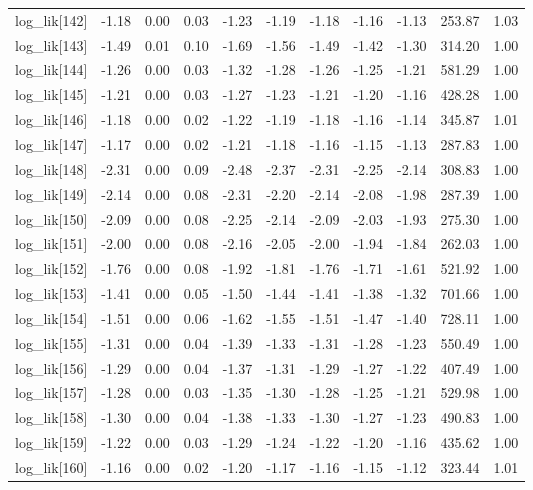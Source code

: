 \begin{table}[ht]
\begin{tabular}{rrrrrrrrrrr}
  log\_lik[142] & -1.18 & 0.00 & 0.03 & -1.23 & -1.19 & -1.18 & -1.16 & -1.13 & 253.87 & 1.03 \\ 
  log\_lik[143] & -1.49 & 0.01 & 0.10 & -1.69 & -1.56 & -1.49 & -1.42 & -1.30 & 314.20 & 1.00 \\ 
  log\_lik[144] & -1.26 & 0.00 & 0.03 & -1.32 & -1.28 & -1.26 & -1.25 & -1.21 & 581.29 & 1.00 \\ 
  log\_lik[145] & -1.21 & 0.00 & 0.03 & -1.27 & -1.23 & -1.21 & -1.20 & -1.16 & 428.28 & 1.00 \\ 
  log\_lik[146] & -1.18 & 0.00 & 0.02 & -1.22 & -1.19 & -1.18 & -1.16 & -1.14 & 345.87 & 1.01 \\ 
  log\_lik[147] & -1.17 & 0.00 & 0.02 & -1.21 & -1.18 & -1.16 & -1.15 & -1.13 & 287.83 & 1.00 \\ 
  log\_lik[148] & -2.31 & 0.00 & 0.09 & -2.48 & -2.37 & -2.31 & -2.25 & -2.14 & 308.83 & 1.00 \\ 
  log\_lik[149] & -2.14 & 0.00 & 0.08 & -2.31 & -2.20 & -2.14 & -2.08 & -1.98 & 287.39 & 1.00 \\ 
  log\_lik[150] & -2.09 & 0.00 & 0.08 & -2.25 & -2.14 & -2.09 & -2.03 & -1.93 & 275.30 & 1.00 \\ 
  log\_lik[151] & -2.00 & 0.00 & 0.08 & -2.16 & -2.05 & -2.00 & -1.94 & -1.84 & 262.03 & 1.00 \\ 
  log\_lik[152] & -1.76 & 0.00 & 0.08 & -1.92 & -1.81 & -1.76 & -1.71 & -1.61 & 521.92 & 1.00 \\ 
  log\_lik[153] & -1.41 & 0.00 & 0.05 & -1.50 & -1.44 & -1.41 & -1.38 & -1.32 & 701.66 & 1.00 \\ 
  log\_lik[154] & -1.51 & 0.00 & 0.06 & -1.62 & -1.55 & -1.51 & -1.47 & -1.40 & 728.11 & 1.00 \\ 
  log\_lik[155] & -1.31 & 0.00 & 0.04 & -1.39 & -1.33 & -1.31 & -1.28 & -1.23 & 550.49 & 1.00 \\ 
  log\_lik[156] & -1.29 & 0.00 & 0.04 & -1.37 & -1.31 & -1.29 & -1.27 & -1.22 & 407.49 & 1.00 \\ 
  log\_lik[157] & -1.28 & 0.00 & 0.03 & -1.35 & -1.30 & -1.28 & -1.25 & -1.21 & 529.98 & 1.00 \\ 
  log\_lik[158] & -1.30 & 0.00 & 0.04 & -1.38 & -1.33 & -1.30 & -1.27 & -1.23 & 490.83 & 1.00 \\ 
  log\_lik[159] & -1.22 & 0.00 & 0.03 & -1.29 & -1.24 & -1.22 & -1.20 & -1.16 & 435.62 & 1.00 \\ 
  log\_lik[160] & -1.16 & 0.00 & 0.02 & -1.20 & -1.17 & -1.16 & -1.15 & -1.12 & 323.44 & 1.01 \\ 

\end{tabular}
\end{table}

